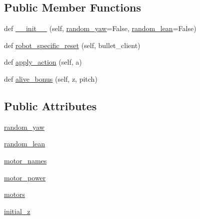 \subsection*{Public Member Functions}
\begin{DoxyCompactItemize}
\item 
def \hyperlink{classpybullet-gym_1_1pybulletgym_1_1envs_1_1roboschool_1_1robots_1_1locomotors_1_1humanoid_1_1_humanoid_ade89870a9a38bc7ac3d554d470ccafac}{\+\_\+\+\_\+init\+\_\+\+\_\+} (self, \hyperlink{classpybullet-gym_1_1pybulletgym_1_1envs_1_1roboschool_1_1robots_1_1locomotors_1_1humanoid_1_1_humanoid_a86299da21924ea1145a77f7fd25c10c2}{random\+\_\+yaw}=False, \hyperlink{classpybullet-gym_1_1pybulletgym_1_1envs_1_1roboschool_1_1robots_1_1locomotors_1_1humanoid_1_1_humanoid_a6feb2e3c017523e776a70f63c1d87a07}{random\+\_\+lean}=False)
\item 
def \hyperlink{classpybullet-gym_1_1pybulletgym_1_1envs_1_1roboschool_1_1robots_1_1locomotors_1_1humanoid_1_1_humanoid_a674ef04ca7a05527ea0d1489d9c31cf6}{robot\+\_\+specific\+\_\+reset} (self, bullet\+\_\+client)
\item 
def \hyperlink{classpybullet-gym_1_1pybulletgym_1_1envs_1_1roboschool_1_1robots_1_1locomotors_1_1humanoid_1_1_humanoid_a9333bd218183ee4b441bcf54af847d12}{apply\+\_\+action} (self, a)
\item 
def \hyperlink{classpybullet-gym_1_1pybulletgym_1_1envs_1_1roboschool_1_1robots_1_1locomotors_1_1humanoid_1_1_humanoid_ab862c85f1f2624208ecbab169de99f7f}{alive\+\_\+bonus} (self, z, pitch)
\end{DoxyCompactItemize}
\subsection*{Public Attributes}
\begin{DoxyCompactItemize}
\item 
\hyperlink{classpybullet-gym_1_1pybulletgym_1_1envs_1_1roboschool_1_1robots_1_1locomotors_1_1humanoid_1_1_humanoid_a86299da21924ea1145a77f7fd25c10c2}{random\+\_\+yaw}
\item 
\hyperlink{classpybullet-gym_1_1pybulletgym_1_1envs_1_1roboschool_1_1robots_1_1locomotors_1_1humanoid_1_1_humanoid_a6feb2e3c017523e776a70f63c1d87a07}{random\+\_\+lean}
\item 
\hyperlink{classpybullet-gym_1_1pybulletgym_1_1envs_1_1roboschool_1_1robots_1_1locomotors_1_1humanoid_1_1_humanoid_a23d90458a5ecd60558b67e9bc7be145c}{motor\+\_\+names}
\item 
\hyperlink{classpybullet-gym_1_1pybulletgym_1_1envs_1_1roboschool_1_1robots_1_1locomotors_1_1humanoid_1_1_humanoid_aa09668f5c32bcb65afd1e124f931843a}{motor\+\_\+power}
\item 
\hyperlink{classpybullet-gym_1_1pybulletgym_1_1envs_1_1roboschool_1_1robots_1_1locomotors_1_1humanoid_1_1_humanoid_ad8651004ae27dc0205c5280fe1e2b205}{motors}
\item 
\hyperlink{classpybullet-gym_1_1pybulletgym_1_1envs_1_1roboschool_1_1robots_1_1locomotors_1_1humanoid_1_1_humanoid_a96ae1cfa9b6f6535fab61be358b06e15}{initial\+\_\+z}
\end{DoxyCompactItemize}
